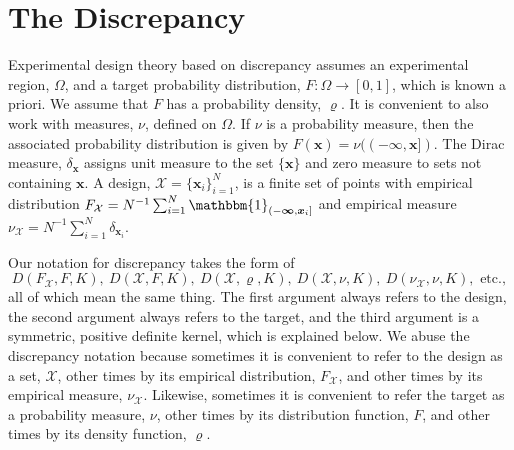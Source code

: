 \documentclass[graybox]{svmult}
\newcommand{\vx}{\boldsymbol{x}}
\newcommand{\vinfty}{\boldsymbol{\infty}}
\newcommand{\Xdes}{\mathcal{X}}
\newcommand{\Ftar}{F}
\newcommand{\ftar}{\varrho}
\newcommand{\bbone}{\mathbbm{1}}
\begin{document}
\section{The Discrepancy} \label{sec:discrepancy}

Experimental design theory based on  discrepancy assumes an experimental region, $\Omega$, and a target probability distribution, $\Ftar:\Omega \to [0,1]$, which is known a priori. We assume that $\Ftar$ has a probability density, $\ftar$.  It is convenient to also work with measures, $\nu$, defined on $\Omega$.  If $\nu$ is a probability measure, then the associated probability distribution is given by $F(\vx) = \nu((-\vinfty,\vx])$.  The Dirac measure, $\delta_{\vx}$ assigns unit measure to the set $\{\vx\}$ and zero measure to sets not containing $\vx$.  A design, $\Xdes = \{\vx_i\}_{i=1}^N$, is a finite set of points with empirical distribution $F_{\Xdes}  = N^{-1} \sum_{i=1}^N \bbone_{(-\vinfty,\vx_i]}$ and empirical measure $\nu_{\Xdes}  = N^{-1} \sum_{i=1}^N \delta_{\vx_i}$.

Our notation for discrepancy takes the form of 
\[
 D(F_{\Xdes},F,K), \ D(\Xdes,F,K), \ D(\Xdes,\varrho,K), \ D(\Xdes,\nu,K), \ D(\nu_{\Xdes},\nu,K), \text{ etc.}, 
\]
all of which mean the same thing.  The first argument always refers to the design, the second argument always refers to the target, and the third argument is a symmetric, positive definite kernel, which is explained below.  We abuse the discrepancy notation because sometimes it is convenient to refer to the design as a set, $\Xdes$, other times by its empirical distribution, $F_{\Xdes}$, and other times by its empirical measure, $\nu_{\Xdes}$.  Likewise, sometimes it is convenient to refer the target as a probability measure,  $\nu$, other times by its distribution function, $F$, and other times by its density function, $\varrho$.
\end{document}
